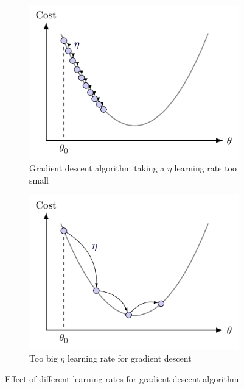 \begin{figure}
    \centering
    \begin{subfigure}{0.5\textwidth}
        \includegraphics[width=\linewidth, keepaspectratio]{img/img-ch1/gd_small.png} 
        \caption{Gradient descent algorithm taking a $\eta$ learning rate too small}
        \label{fig:GD small learning rate}
    \end{subfigure}
    
    \begin{subfigure}{0.5\textwidth}
        \includegraphics[width=\linewidth, keepaspectratio]{img/img-ch1/gd_big.png}
        \caption{Too big $\eta$ learning rate for gradient descent}
        \label{fig:GD big learning rate}
    \end{subfigure}
    
    \caption{Effect of different learning rates for gradient descent algorithm}
    \label{fig:learning_rates}
\end{figure}

